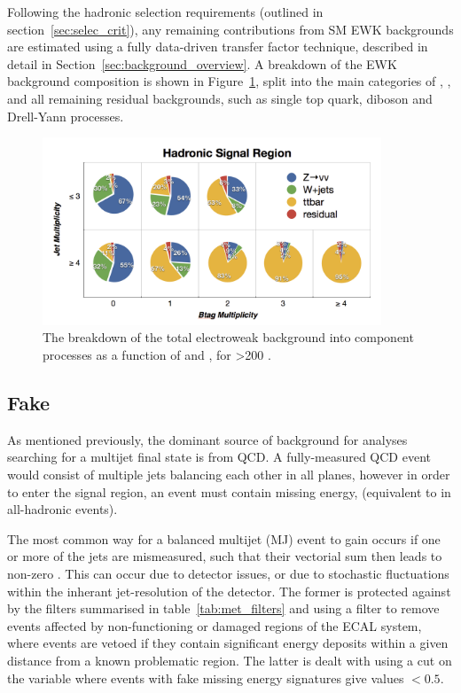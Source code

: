 
Following the hadronic selection requirements (outlined in
section~\ref{sec:selec_crit}),
any remaining contributions from SM EWK backgrounds are estimated using a 
fully data-driven transfer factor technique, described in detail in
Section~\ref{sec:background_overview}. A breakdown of the EWK background 
composition is shown in Figure~\ref{fig:background_decomp}, split into the main 
categories of \zinv, \wj, \ttbar and all remaining residual backgrounds, such as
single top quark, diboson and Drell-Yann processes.

\begin{figure}[hb!]
\centering
\hspace{0cm}\includegraphics[width=0.9\textwidth, trim=0 00 0 0, clip=true]
{Figs/ra1_had_bg_comp_v3.png}
\caption{The breakdown of the total electroweak background into component
processes as a function of \nj and \nb, for \HT>200 \gev.}
\label{fig:background_decomp}
\end{figure}

\subsection{Fake \met}

As mentioned previously, the dominant source of background for analyses 
searching for a multijet final state is from QCD. A fully-measured QCD event 
would consist of multiple jets balancing each other in all planes, however in 
order to enter the signal region, an event must contain missing energy, 
\mht (equivalent to \met in all-hadronic events).

The most common way for a balanced multijet (MJ) event to gain \mht occurs if
one
or more of the jets are mismeasured, such that their vectorial sum then leads to non-zero
\mht. This can occur due to detector issues, or due to stochastic fluctuations
within
the inherant jet-resolution of the 
detector. The former is protected against by the \met filters summarised in 
table~\ref{tab:met_filters} and using a filter to remove events
affected by non-functioning or damaged regions of the ECAL system, where 
events are vetoed if they contain significant energy deposits within a given 
distance from a known problematic region. The latter is dealt with using a
cut on the \alphat variable where 
events with fake missing energy signatures give values $<0.5$.

